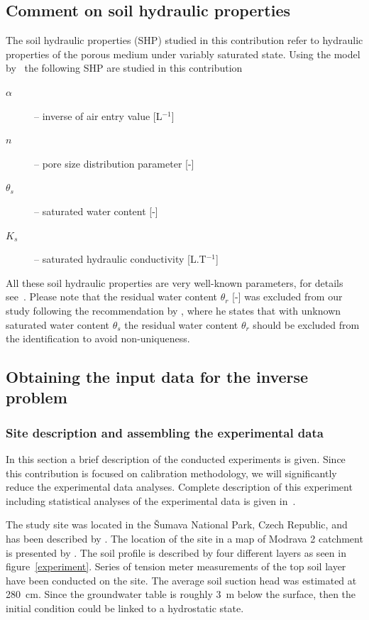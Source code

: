 \documentclass[review,times,3p,10pt]{elsarticle}
\begin{document}
{\subsection{Comment on soil hydraulic properties}
\label{shpdescr}

 The soil hydraulic properties (SHP) studied in this contribution refer to hydraulic properties of the porous medium under variably saturated state. Using the model by~\cite{vangenuchten} the following SHP are studied in this contribution
\begin{description}
\item[$\alpha$] -- inverse of air entry value [L$^{-1}$]
\item[$n$] -- pore size distribution parameter [-]
\item[$\theta_s$] -- saturated water content [-]
\item[$K_s$] -- saturated hydraulic conductivity [L.T$^{-1}$]
\end{description}
All these soil hydraulic properties are very well-known parameters, for details see~\citep{vangenuchten}. Please note that the residual water content $\theta_r$ [-] was excluded from our study following the recommendation by \cite{mous1993}, where he states that with unknown saturated water content $\theta_s$ the residual water content $\theta_r$ should be excluded from the identification to avoid non-uniqueness.




\subsection{Obtaining the input data for the inverse problem}
\label{assamb}



\subsubsection{Site description and assembling the experimental data}%
\label{site}

\label{povodi}

{In this section a brief description of the conducted experiments is given. Since this contribution is focused on calibration methodology, we will significantly reduce the experimental data analyses. Complete description of this experiment including statistical analyses of the experimental data is given in~\citep{jacka-site}.
}


The study site was located in the \v{S}umava National Park, {Czech Republic}, and has been described by \cite{Jacka1}. The location of the site in a map of Modrava 2 catchment is presented by \cite{Jacka2}.
The soil profile is described by four different layers as seen in figure~\ref{experiment}. 
{Series  of tension meter measurements of the top soil layer have been conducted on the site. The average soil suction head was estimated at 280~cm. Since the groundwater table is roughly 3~m below the surface, then the initial condition could be linked to a hydrostatic state.    }





}
\end{document}
